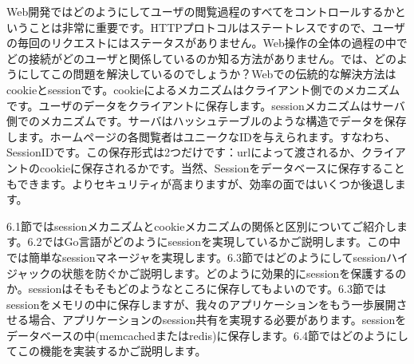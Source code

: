 Web開発ではどのようにしてユーザの閲覧過程のすべてをコントロールするかということは非常に重要です。HTTPプロトコルはステートレスですので、ユーザの毎回のリクエストにはステータスがありません。Web操作の全体の過程の中でどの接続がどのユーザと関係しているのか知る方法がありません。では、どのようにしてこの問題を解決しているのでしょうか？Webでの伝統的な解決方法はcookieとsessionです。cookieによるメカニズムはクライアント側でのメカニズムです。ユーザのデータをクライアントに保存します。sessionメカニズムはサーバ側でのメカニズムです。サーバはハッシュテーブルのような構造でデータを保存します。ホームページの各閲覧者はユニークなIDを与えられます。すなわち、SessionIDです。この保存形式は2つだけです：urlによって渡されるか、クライアントのcookieに保存されるかです。当然、Sessionをデータベースに保存することもできます。よりセキュリティが高まりますが、効率の面ではいくつか後退します。

6.1節ではsessionメカニズムとcookieメカニズムの関係と区別についてご紹介します。6.2ではGo言語がどのようにsessionを実現しているかご説明します。この中では簡単なsessionマネージャを実現します。6.3節ではどのようにしてsessionハイジャックの状態を防ぐかご説明します。どのように効果的にsessionを保護するのか。sessionはそもそもどのようなところに保存してもよいのです。6.3節ではsessionをメモリの中に保存しますが、我々のアプリケーションをもう一歩展開させる場合、アプリケーションのsession共有を実現する必要があります。sessionをデータベースの中(memcachedまたはredis)に保存します。6.4節ではどのようにしてこの機能を実装するかご説明します。
